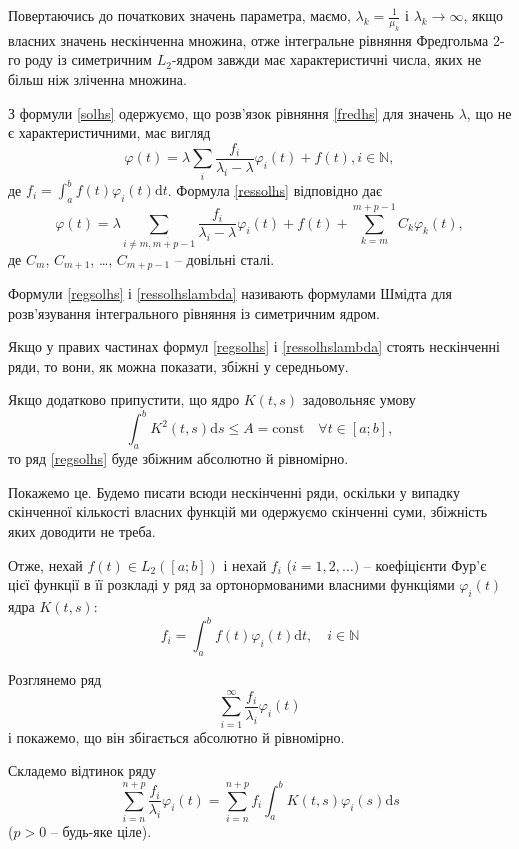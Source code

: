 \documentclass[14pt,twoside]{extreport}
\theoremstyle{mystyle}
\numberwithin{equation}{chapter}
\begin{document}
Повертаючись до початкових значень параметра, маємо, $\lambda_k = \frac{1}{\mu_k}$ і $\lambda_k \to \infty$, якщо власних значень нескінченна множина, отже інтегральне рівняння Фредгольма 2-го роду із симетричним $L_2$-ядром завжди має характеристичні числа, яких не більш ніж зліченна множина.

З формули \eqref{solhs} одержуємо, що розв'язок рівняння \eqref{fredhs} для значень $\lambda$, що не є характеристичними, має вигляд
\begin{equation}\label{regsolhs}
 \varphi(t) = \lambda \sum_{i} \frac{f_i}{\lambda_i - \lambda} \varphi_i(t) + f(t), i\in \mathbb{N},
\end{equation}
де $f_i = \int_a^b f(t) \varphi_i (t) \mathrm{d}t$. Формула \eqref{ressolhs} відповідно дає
\begin{equation}\label{ressolhslambda}
 \varphi(t) = \lambda \sum_{i\neq \overline{m, m+p-1}} \frac{f_i}{\lambda_i - \lambda} \varphi_i(t) +f(t) + \sum_{k=m}^{m+p-1} C_k \varphi_k (t),
\end{equation}
де $C_m$, $C_{m+1}$, \ldots , $C_{m+p-1}$ -- довільні сталі.

Формули \eqref{regsolhs} і \eqref{ressolhslambda} називають формулами Шмідта для розв'язування інтегрального рівняння із симетричним ядром.

Якщо у правих частинах формул \eqref{regsolhs} і \eqref{ressolhslambda} стоять нескінченні ряди, то вони, як можна показати, збіжні у середньому.

Якщо додатково припустити, що ядро $K(t, s)$ задовольняє умову
\[
 \int_a^b K^2 (t, s) \mathrm{d}s \leqslant A = \textrm{const} \quad \forall t \in [a; b],
\]
то ряд \eqref{regsolhs} буде збіжним абсолютно й рівномірно.

Покажемо це. Будемо писати всюди нескінченні ряди, оскільки у випадку скінченної кількості власних функцій ми одержуємо скінченні суми, збіжність яких доводити не треба.

Отже, нехай $f(t) \in L_2([a; b])$ і нехай $f_i$ ($i = 1, 2, \ldots)$ -- коефіцієнти Фур'є цієї функції в її розкладі у ряд за ортонормованими власними функціями $\varphi_i(t)$ ядра $K(t, s)$:
\[
 f_i = \int_a^b f(t) \varphi_i(t) \mathrm{d} t, \quad i \in \mathbb{N}
\]

Розглянемо ряд
\[
 \sum_{i=1}^{\infty} \frac{f_i}{\lambda_i} \varphi_i(t)
\]
і покажемо, що він збігається абсолютно й рівномірно.

Складемо відтинок ряду
\[
 \sum_{i=n}^{n+p} \frac{f_i}{\lambda_i} \varphi_i(t) = \sum_{i=n}^{n+p} f_i \int_a^b K(t, s) \varphi_i(s) \mathrm{d} s
\]
($p > 0$ -- будь-яке ціле).
\end{document}
